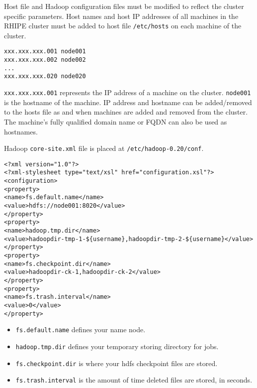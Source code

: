 \documentclass[11pt]{article}
\begin{document}

Host file and Hadoop configuration files must be modified to reflect the
cluster specific parameters. Host names and host IP addresses of all
machines in the RHIPE cluster must be added to host file
\texttt{/etc/hosts} on each machine of the cluster.

\begin{verbatim}
xxx.xxx.xxx.001 node001
xxx.xxx.xxx.002 node002
...
xxx.xxx.xxx.020 node020
\end{verbatim}

\texttt{xxx.xxx.xxx.001} represents the IP address of a machine on the
cluster. \texttt{node001} is the hostname of the machine. IP address and
hostname can be added/removed to the hosts file as and when machines are
added and removed from the cluster. The machine's fully qualified domain
name or FQDN can also be used as hostnames.


Hadoop \texttt{core-site.xml} file is placed at
\texttt{/etc/hadoop-0.20/conf}.

\begin{verbatim}
<?xml version="1.0"?>
<?xml-stylesheet type="text/xsl" href="configuration.xsl"?>
<configuration>
<property>
<name>fs.default.name</name>
<value>hdfs://node001:8020</value>
</property>
<property>
<name>hadoop.tmp.dir</name>
<value>hadoopdir-tmp-1-${username},hadoopdir-tmp-2-${username}</value>
</property>
<property>
<name>fs.checkpoint.dir</name>
<value>hadoopdir-ck-1,hadoopdir-ck-2</value>
</property>
<property>
<name>fs.trash.interval</name>
<value>0</value>
</property>
\end{verbatim}

\begin{itemize}
\itemsep1pt\parskip0pt
\item
  \texttt{fs.default.name} defines your name node.
\item
  \texttt{hadoop.tmp.dir} defines your temporary storing directory for
  jobs.
\item
  \texttt{fs.checkpoint.dir} is where your hdfs checkpoint files are
  stored.
\item
  \texttt{fs.trash.interval} is the amount of time deleted files are
  stored, in seconds.
\end{itemize}
\end{document}
